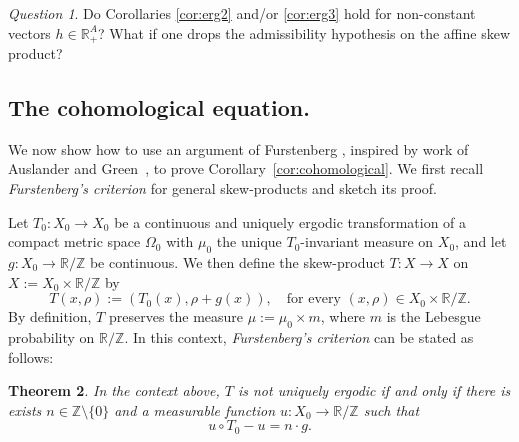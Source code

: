 \documentclass{amsart}
\newtheorem{theorem}{Theorem}[section]
\theoremstyle{definition}
\theoremstyle{remark}
\newtheorem{question}[theorem]{Question}
\numberwithin{equation}{section}
\newcommand{\<}{{\langle}}
\renewcommand{\>}{{\rangle}}
\newcommand{\field}[1]{\mathbb{#1}}
\newcommand{\R}{\field{R}}
\newcommand{\Z}{\field{Z}}
\newcommand{\Om}{\Omega}
\newcommand{\francisco}[1]{{\color{red} \sf  F: [#1]}}
\newcommand{\jayadev}[1]{{\color{purple} \sf  J: [#1]}}
\begin{document}
\begin{question}
    Do Corollaries \ref{cor:erg2} and/or \ref{cor:erg3} hold for non-constant vectors $h \in \R^A_+$? What if one drops the admissibility hypothesis on the affine skew product?
\end{question}



\subsection{The cohomological equation.} \label{sec:furst} We now show how to use an argument of Furstenberg \cite{Fu61}, inspired by work of Auslander and Green~\cite{nil2}, to prove Corollary~\ref{cor:cohomological}. We first recall \textit{Furstenberg's criterion} for general skew-products and sketch its proof. 

Let $T_0: X_0 \rightarrow X_0$ be a continuous and uniquely ergodic transformation of a compact metric space $\Om_0$ with $\mu_0$ the unique $T_0$-invariant measure on $X_0$, and let $g: X_0 \rightarrow \R/\Z$ be continuous. We then define the skew-product $T: X \rightarrow X$ on $X := X_0 \times \R/\Z$ by \begin{equation}\label{eq:skewproduct} T(x, \rho) := (T_0 (x), \rho+g(x)), \quad \text{for every } (x,\rho) \in X_0 \times \mathbb{R}/\mathbb{Z}. \end{equation} By definition, $T$ preserves the measure $\mu := \mu_0 \times m$, where $m$ is the Lebesgue probability on $\R/\Z$. In this context, \textit{Furstenberg's criterion} can be stated as follows:

\begin{theorem}
    \label{theo:furst}
    In the context above, $T$ is not uniquely ergodic if and only if there is exists $n \in \Z \setminus \{0\}$ and a measurable function $u: X_0 \rightarrow \R/\Z$ such that \begin{equation}\label{eq:furstenberg} u \circ T_0 - u = n \cdot g. \end{equation}
\end{theorem}
\end{document}
